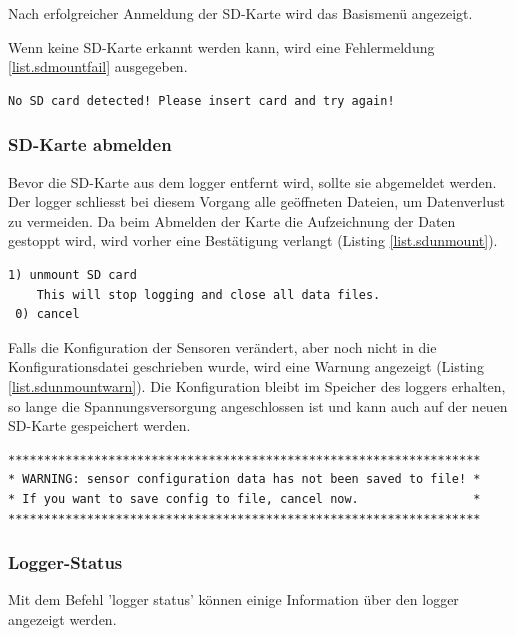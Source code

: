 Nach erfolgreicher Anmeldung der SD-Karte wird das Basismenü angezeigt. 

Wenn keine SD-Karte erkannt werden kann, wird eine Fehlermeldung \ref{list.sdmountfail} ausgegeben.

\begin{lstlisting}[caption=Fehlermeldung SD-Karte anmelden, label=list.sdmountfail]
No SD card detected! Please insert card and try again!
\end{lstlisting}


\subsubsection{SD-Karte abmelden}\label{sssec.sdunmount}
Bevor die SD-Karte aus dem \gls{logger} entfernt wird, sollte sie abgemeldet werden. Der \gls{logger} schliesst bei diesem Vorgang alle geöffneten Dateien, um Datenverlust zu vermeiden. Da beim Abmelden der Karte die Aufzeichnung der Daten gestoppt wird, wird vorher eine Bestätigung verlangt (Listing \ref{list.sdunmount}).

\begin{lstlisting}[caption=Untermenü SD-Karte abmelden, label=list.sdunmount]
 1) unmount SD card
    This will stop logging and close all data files.
 0) cancel
\end{lstlisting}

Falls die Konfiguration der Sensoren verändert, aber noch nicht in die Konfigurationsdatei geschrieben wurde, wird eine Warnung angezeigt (Listing \ref{list.sdunmountwarn}). Die Konfiguration bleibt im Speicher des \gls{logger}s erhalten, so lange die Spannungsversorgung angeschlossen ist und kann auch auf der neuen SD-Karte gespeichert werden.

\begin{lstlisting}[caption=Warnung vor SD-Karte abmelden bei ungespeicherter Konfiguration, label=list.sdunmountwarn]
******************************************************************
* WARNING: sensor configuration data has not been saved to file! *
* If you want to save config to file, cancel now.                *
******************************************************************
\end{lstlisting}

\subsubsection{Logger-Status}\label{sssec.loggerstate}
Mit dem Befehl 'logger status' können einige Information über den \gls{logger} angezeigt werden.

